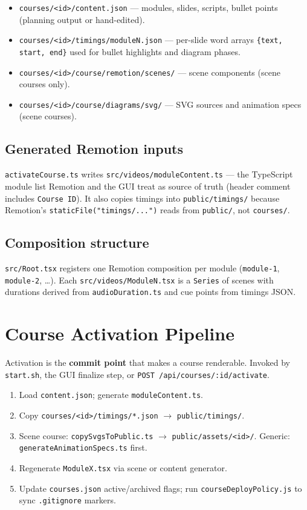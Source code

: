 \documentclass{scinexus}
\begin{document}
\begin{itemize}
	\item \texttt{courses/<id>/content.json} --- modules, slides, scripts, bullet points (planning output or hand-edited).
	\item \texttt{courses/<id>/timings/moduleN.json} --- per-slide word arrays \texttt{\{text, start, end\}} used for bullet highlights and diagram phases.
	\item \texttt{courses/<id>/course/remotion/scenes/} --- scene components (scene courses only).
	\item \texttt{courses/<id>/course/diagrams/svg/} --- SVG sources and animation specs (scene courses).
\end{itemize}

\subsection{Generated Remotion inputs}

\texttt{activateCourse.ts} writes \texttt{src/videos/moduleContent.ts} --- the TypeScript module list Remotion and the GUI treat as source of truth (header comment includes \texttt{Course ID}). It also copies timings into \texttt{public/timings/} because Remotion's \texttt{staticFile("timings/...")} reads from \texttt{public/}, not \texttt{courses/}.

\subsection{Composition structure}

\texttt{src/Root.tsx} registers one Remotion composition per module (\texttt{module-1}, \texttt{module-2}, \ldots). Each \texttt{src/videos/ModuleN.tsx} is a \texttt{Series} of scenes with durations derived from \texttt{audioDuration.ts} and cue points from timings JSON.

\section{Course Activation Pipeline}

Activation is the \textbf{commit point} that makes a course renderable. Invoked by \texttt{start.sh}, the GUI finalize step, or \texttt{POST /api/courses/:id/activate}.

\diagramActivatePipeline

\begin{enumerate}
	\item Load \texttt{content.json}; generate \texttt{moduleContent.ts}.
	\item Copy \texttt{courses/<id>/timings/*.json} $\rightarrow$ \texttt{public/timings/}.
	\item Scene course: \texttt{copySvgsToPublic.ts} $\rightarrow$ \texttt{public/assets/<id>/}. Generic: \texttt{generateAnimationSpecs.ts} first.
	\item Regenerate \texttt{ModuleX.tsx} via scene or content generator.
	\item Update \texttt{courses.json} active/archived flags; run \texttt{courseDeployPolicy.js} to sync \texttt{.gitignore} markers.
\end{enumerate}
\end{document}
